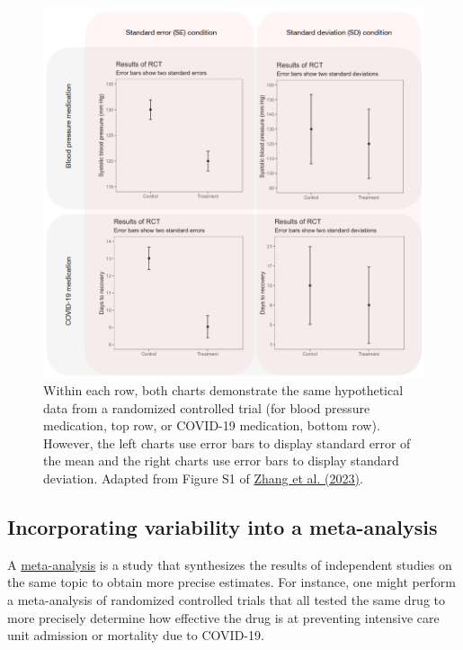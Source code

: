 \documentclass[letterpaper, 12pt]{article}
\begin{document}
\begin{figure}[h!tbp]
    \includegraphics[width=\textwidth]{img/sd_vs_se/zhang_se_vs_sd.png}
    \caption*{Within each row, both charts demonstrate the same hypothetical data from a randomized controlled trial (for blood pressure medication, top row, or COVID-19 medication, bottom row). However, the left charts use error bars to display standard error of the mean and the right charts use error bars to display standard deviation. Adapted from Figure S1 of \href{https://doi.org/10.1073/pnas.2302491120}{Zhang et al. (2023)}.}
\end{figure}

\pagebreak

\subsection*{Incorporating variability into a meta-analysis}

A \href{https://en.wikipedia.org/wiki/Meta-analysis}{meta-analysis} is a study that synthesizes the results of independent studies on the same topic to obtain more precise estimates. For instance, one might perform a meta-analysis of randomized controlled trials that all tested the same drug to more precisely determine how effective the drug is at preventing intensive care unit admission or mortality due to COVID-19.
\end{document}
